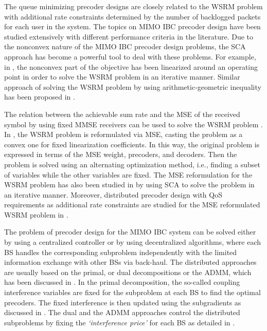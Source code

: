 The queue minimizing precoder designs are closely related to the \ac{WSRM} problem with additional rate constraints determined by the number of backlogged packets for each user in the system. The topics on \ac{MIMO} \ac{IBC} precoder design have been studied extensively with different performance criteria in the literature. Due to the nonconvex nature of the \ac{MIMO} \ac{IBC} precoder design problems, the \ac{SCA} approach has become a powerful tool to deal with these problems. For example, in \cite{sin_algorithm}, the nonconvex part of the objective has been linearized around an operating point in order to solve the \ac{WSRM} problem in an iterative manner. Similar approach of solving the \ac{WSRM} problem by using arithmetic-geometric inequality has been proposed in \cite{tran2012fast}.

The relation between the achievable sum rate and the \ac{MSE} of the received symbol by using fixed \ac{MMSE} receivers can be used to solve the \ac{WSRM} problem \cite{mse_duality}. In \cite{christensen2008weighted,wmmse_shi}, the \ac{WSRM} problem is reformulated via \ac{MSE}, casting the problem as a convex one for fixed linearization coefficients. In this way, the original problem is expressed in terms of the \ac{MSE} weight, precoders, and decoders. Then the problem is solved using an alternating optimization method, i.e., finding a subset of variables while the other variables are fixed. The \ac{MSE} reformulation for the \ac{WSRM} problem has also been studied in \cite{hong2012decomposition} by using \ac{SCA} to solve the problem in an iterative manner. Moreover, distributed precoder design with \ac{QoS} requirements as additional rate constraints are studied for the \ac{MSE} reformulated \ac{WSRM} problem in \cite{kaleva2013primal,kaleva2013decentralized}.

The problem of precoder design for the \ac{MIMO} \ac{IBC} system can be solved either by using a centralized controller or by using decentralized algorithms, where each \ac{BS} handles the corresponding subproblem independently with the limited information exchange with other \acp{BS} via back-haul. The distributed approaches are usually based on the primal, or dual decompositions or the \ac{ADMM}, which has been discussed in \cite{palomar2006tutorial,boyd2011distributed}. In the  primal decomposition, the so-called coupling interference variables are fixed for the subproblem at each \ac{BS} to find the optimal precoders. The fixed interference is then updated using the subgradients as discussed in \cite{pennanen2011decentralized}. The dual and the \ac{ADMM} approaches control the distributed subproblems by fixing the \emph{`interference price'} for each \ac{BS} as detailed in \cite{tolli2011decentralized}.


